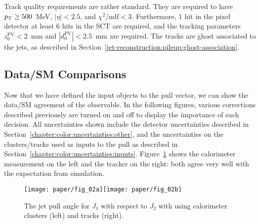 Track quality requirements are rather standard. They are required to have $p_{\text{T}} \geq 500$~MeV, $|\eta| < 2.5$, and $\chi^2/\mathrm{ndf} < 3$. Furthermore, 1 hit in the pixel detector at least 6 hits in the SCT are required, and the tracking parameters $z_0^\mathrm{PV} < 2$~mm and $|d_0^\mathrm{PV}| < 2.5$~mm are required. The tracks are ghost associated to the jets, as described in Section~\ref{jet-reconstruction:pileup:ghost-association}.

\subsection{Data/SM Comparisons}
\label{chapter:color:comparisons}

Now that we have defined the input objects to the pull vector, we can show the data/SM agreement of the observable. In the following figures, various corrections described previously are turned on and off to display the importance of each decision. All uncertainties shown include the detector uncertainties described in Section~\ref{chapter:color:uncertainties:other}, and the uncertainties on the clusters/tracks used as inputs to the pull as described in Section~\ref{chapter:color:uncertainties:inputs}. Figure~\ref{fig:color:substructure:pull_fixed} shows the calorimeter measurement on the left and the tracker on the right: both agree very well with the expectation from simulation.


\begin{figure}[h!]
\begin{center}
\texttt{[image: paper/fig\_02a]}\texttt{[image: paper/fig\_02b]}
 \caption{The jet pull angle for $J_1$ with respect to $J_2$ with using calorimeter clusters (left) and tracks (right).}
 \label{fig:color:substructure:pull_fixed}
  \end{center}
\end{figure}




